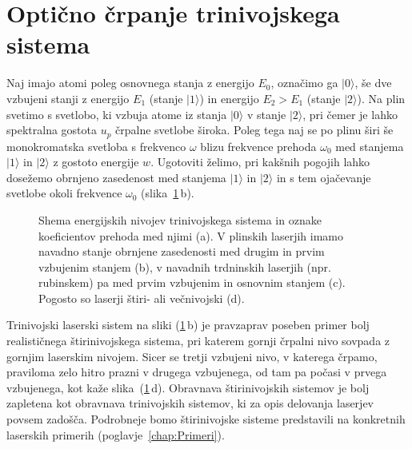 \section{Optično črpanje trinivojskega sistema}
Naj imajo atomi poleg osnovnega stanja z energijo $E_0$, označimo ga $|0\rangle$,
še dve vzbujeni stanji z energijo $E_1$ (stanje $|1\rangle$) in energijo $E_2>E_1$
(stanje $|2\rangle$). Na plin svetimo s svetlobo, ki
vzbuja atome iz stanja $|0\rangle$ v stanje $|2\rangle$, pri čemer
je lahko spektralna gostota $u_{p}$ črpalne svetlobe široka. Poleg
tega naj se po plinu širi še monokromatska svetloba s frekvenco $\omega$
blizu frekvence prehoda $\omega_{0}$ med stanjema $|1\rangle$ in
$|2\rangle$ z gostoto energije $w$. Ugotoviti želimo, pri kakšnih
pogojih lahko dosežemo obrnjeno zasedenost med stanjema $|1\rangle$ in $|2\rangle$
in s tem ojačevanje svetlobe okoli frekvence $\omega_{0}$ (slika~\ref{fig:3nivojski}\,b).
\begin{figure}[h]
\centering
\def\svgwidth{140truemm} 

\caption{Shema energijskih nivojev trinivojskega sistema in oznake koeficientov
prehoda med njimi (a). 
V plinskih laserjih imamo navadno stanje obrnjene zasedenosti med drugim in prvim
vzbujenim stanjem (b), v navadnih trdninskih laserjih (npr. rubinskem) pa med 
prvim vzbujenim in osnovnim stanjem (c). Pogosto so laserji štiri- ali večnivojski (d).}
\label{fig:3nivojski}
\end{figure}
\begin{remark}
Trinivojski laserski sistem na sliki (\ref{fig:3nivojski}\,b) je pravzaprav 
poseben primer bolj realističnega štirinivojskega sistema, 
pri katerem gornji črpalni nivo sovpada z gornjim laserskim nivojem. Sicer se tretji vzbujeni nivo, 
v katerega črpamo, praviloma zelo hitro prazni v drugega vzbujenega, od tam pa počasi v prvega vzbujenega, 
kot kaže slika~(\ref{fig:3nivojski}\,d).
Obravnava štirinivojskih sistemov je bolj zapletena kot obravnava trinivojskih sistemov, 
ki za opis delovanja laserjev povsem zadošča. Podrobneje bomo štirinivojske sisteme predstavili na konkretnih laserskih primerih (poglavje~\ref{chap:Primeri}).
\end{remark}

